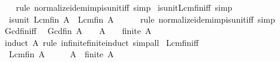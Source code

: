 \begin{isabellebody}
%
\isadelimproof
\ \ %
\endisadelimproof
%
\isatagproof
{}\isamarkupfalse%
\ {\isacharparenleft}{\kern0pt}rule\ normalize{\isacharunderscore}{\kern0pt}idem{\isacharunderscore}{\kern0pt}imp{\isacharunderscore}{\kern0pt}is{\isacharunderscore}{\kern0pt}unit{\isacharunderscore}{\kern0pt}iff{\isacharparenright}{\kern0pt}\ simp%
\endisatagproof
{\isafoldproof}%
%
\isadelimproof
\isanewline
%
\endisadelimproof
\isanewline
{}\isamarkupfalse%
\ is{\isacharunderscore}{\kern0pt}unit{\isacharunderscore}{\kern0pt}Lcm{\isacharunderscore}{\kern0pt}fin{\isacharunderscore}{\kern0pt}iff\ {\isacharbrackleft}{\kern0pt}simp{\isacharbrackright}{\kern0pt}{\isacharcolon}{\kern0pt}\isanewline
\ \ {\isachardoublequoteopen}is{\isacharunderscore}{\kern0pt}unit\ {\isacharparenleft}{\kern0pt}Lcm\isactrlsub f\isactrlsub i\isactrlsub n\ A{\isacharparenright}{\kern0pt}\ {\isasymlongleftrightarrow}\ Lcm\isactrlsub f\isactrlsub i\isactrlsub n\ A\ {\isacharequal}{\kern0pt}\ {}{\isachardoublequoteclose}\isanewline
%
\isadelimproof
\ \ %
\endisadelimproof
%
\isatagproof
{}\isamarkupfalse%
\ {\isacharparenleft}{\kern0pt}rule\ normalize{\isacharunderscore}{\kern0pt}idem{\isacharunderscore}{\kern0pt}imp{\isacharunderscore}{\kern0pt}is{\isacharunderscore}{\kern0pt}unit{\isacharunderscore}{\kern0pt}iff{\isacharparenright}{\kern0pt}\ simp%
\endisatagproof
{\isafoldproof}%
%
\isadelimproof
\isanewline
%
\endisadelimproof
\ \isanewline
{}\isamarkupfalse%
\ Gcd{\isacharunderscore}{\kern0pt}fin{\isacharunderscore}{\kern0pt}{}{\isacharunderscore}{\kern0pt}iff{\isacharcolon}{\kern0pt}\isanewline
\ \ {\isachardoublequoteopen}Gcd\isactrlsub f\isactrlsub i\isactrlsub n\ A\ {\isacharequal}{\kern0pt}\ {}\ {\isasymlongleftrightarrow}\ A\ {\isasymsubseteq}\ {\isacharbraceleft}{\kern0pt}{}{\isacharbraceright}{\kern0pt}\ {\isasymand}\ finite\ A{\isachardoublequoteclose}\isanewline
%
\isadelimproof
\ \ %
\endisadelimproof
%
\isatagproof
{}\isamarkupfalse%
\ {\isacharparenleft}{\kern0pt}induct\ A\ rule{\isacharcolon}{\kern0pt}\ infinite{\isacharunderscore}{\kern0pt}finite{\isacharunderscore}{\kern0pt}induct{\isacharparenright}{\kern0pt}\ simp{\isacharunderscore}{\kern0pt}all%
\endisatagproof
{\isafoldproof}%
%
\isadelimproof
\isanewline
%
\endisadelimproof
\isanewline
{}\isamarkupfalse%
\ Lcm{\isacharunderscore}{\kern0pt}fin{\isacharunderscore}{\kern0pt}{}{\isacharunderscore}{\kern0pt}iff{\isacharcolon}{\kern0pt}\isanewline
\ \ {\isachardoublequoteopen}Lcm\isactrlsub f\isactrlsub i\isactrlsub n\ A\ {\isacharequal}{\kern0pt}\ {}\ {\isasymlongleftrightarrow}\ {}\ {\isasymin}\ A{\isachardoublequoteclose}\ \ {\isachardoublequoteopen}finite\ A{\isachardoublequoteclose}\isanewline

\end{isabellebody}

